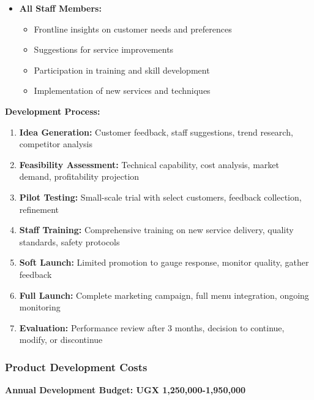 \documentclass[a4paper,12pt]{article}
\begin{document}
\begin{itemize}[leftmargin=2em]
    \item \textbf{All Staff Members:}
    \begin{itemize}
        \item Frontline insights on customer needs and preferences
        \item Suggestions for service improvements
        \item Participation in training and skill development
        \item Implementation of new services and techniques
    \end{itemize}
\end{itemize}

\textbf{Development Process:}
\begin{enumerate}[leftmargin=2em]
    \item \textbf{Idea Generation:} Customer feedback, staff suggestions, trend research, competitor analysis
    \item \textbf{Feasibility Assessment:} Technical capability, cost analysis, market demand, profitability projection
    \item \textbf{Pilot Testing:} Small-scale trial with select customers, feedback collection, refinement
    \item \textbf{Staff Training:} Comprehensive training on new service delivery, quality standards, safety protocols
    \item \textbf{Soft Launch:} Limited promotion to gauge response, monitor quality, gather feedback
    \item \textbf{Full Launch:} Complete marketing campaign, full menu integration, ongoing monitoring
    \item \textbf{Evaluation:} Performance review after 3 months, decision to continue, modify, or discontinue
\end{enumerate}

\subsubsection{Product Development Costs}

\textbf{Annual Development Budget: UGX 1,250,000-1,950,000}
\end{document}
